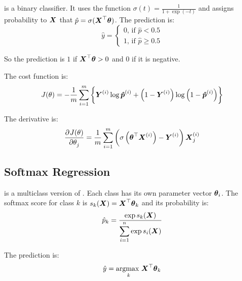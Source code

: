  is a binary classifier. It uses the  function $\displaystyle \sigma(t) = \frac{1}{1 + \exp{(-t)}}$ and assigns probability to $\boldsymbol{X}$ that $\hat{p} = \sigma(\boldsymbol{X}^\top \boldsymbol{\theta} )$. The prediction is:
\begin{equation}
	\hat{y} = \begin{cases}
		0 \text{, if } \hat{p} < 0.5 \\
		1 \text{, if } \hat{p} \geq 0.5
	\end{cases}
\end{equation}

So the prediction is $1$ if $\boldsymbol{X}^\top \boldsymbol{\theta} > 0$ and $0$ if it is negative.

The  cost function is:
\begin{equation}
	J(\theta) = - \frac{1}{m} \sum_{i=1}^m \left\{ \boldsymbol{Y}^{(i)} \log \boldsymbol{\hat{p}}^{(i)} + \left(1- \boldsymbol{Y}^{(i)} \right) \log \left(1 - \boldsymbol{\hat{p}}^{(i)} \right) \right\}
\end{equation}

The derivative is:
\begin{equation}
	\dpd{J(\theta)}{\theta_j} = \frac{1}{m} \sum_{i=1}^m \left( \sigma \left(\columnvector{\theta}^\top \subscription{X}{i} \right) - \subscription{Y}{i} \right) \subscription{X}{i}_j
\end{equation}




\subsection{Softmax Regression}


 is a multiclass version of . Each class has its own parameter vector $\boldsymbol{\theta}_i$. The softmax score for class $k$ is $s_k (\boldsymbol{X} ) = \boldsymbol{X}^\top \boldsymbol{\theta}_k$ and its probability is:
\begin{equation}
    \hat{p}_k = \frac{\exp{{s_k (\boldsymbol{X})}}}{\displaystyle \sum_{i=1}^n \exp{s_i (\boldsymbol{X}) } }
\end{equation}

The prediction is:
\begin{equation}
	\hat{y} = \underset{k}{\text{argmax }} \boldsymbol{X}^\top \boldsymbol{\theta}_k
\end{equation}

